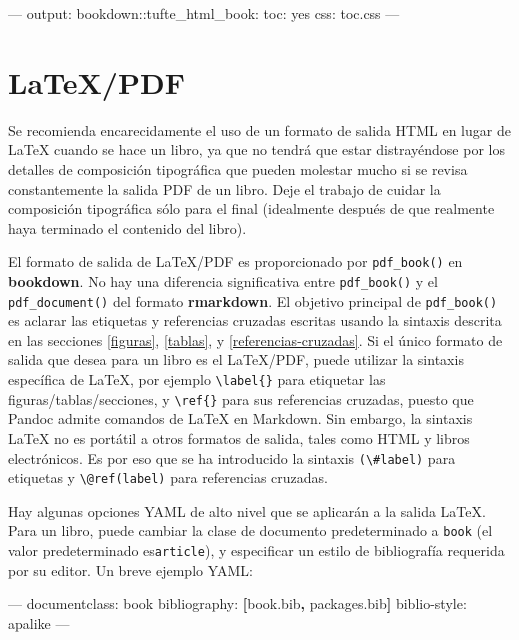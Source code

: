 \documentclass[12pt,]{krantz}
\makeatletter
\newenvironment{Shaded}{\begin{snugshade}}{\end{snugshade}}
\newcommand{\KeywordTok}[1]{\textcolor[rgb]{0.13,0.29,0.53}{\textbf{#1}}}
\newcommand{\OtherTok}[1]{\textcolor[rgb]{0.56,0.35,0.01}{#1}}
\newcommand{\FunctionTok}[1]{\textcolor[rgb]{0.00,0.00,0.00}{#1}}
\newcommand{\AttributeTok}[1]{\textcolor[rgb]{0.77,0.63,0.00}{#1}}
\newcommand{\NormalTok}[1]{#1}
\newenvironment{kframe}{%
\medskip{}
\setlength{\fboxsep}{.8em}
 \def\at@end@of@kframe{}%
 \ifinner\ifhmode%
  \def\at@end@of@kframe{\end{minipage}}%
  \begin{minipage}{\columnwidth}%
 \fi\fi%
 \def\FrameCommand##1{\hskip\@totalleftmargin \hskip-\fboxsep
 \colorbox{shadecolor}{##1}\hskip-\fboxsep
     \hskip-\linewidth \hskip-\@totalleftmargin \hskip\columnwidth}%
 \MakeFramed {\advance\hsize-\width
   \@totalleftmargin\z@ \linewidth\hsize
   \@setminipage}}%
 {\par\unskip\endMakeFramed%
 \at@end@of@kframe}
\renewenvironment{Shaded}{\begin{kframe}}{\end{kframe}}
\theoremstyle{definition}
\theoremstyle{definition}
\theoremstyle{definition}
\theoremstyle{remark}
\makeatother
\begin{document}
\begin{Shaded}
\begin{Highlighting}[]
\OtherTok{---}
\FunctionTok{output:}
  \FunctionTok{bookdown:}\AttributeTok{:tufte_html_book:}
    \FunctionTok{toc:}\AttributeTok{ yes}
    \FunctionTok{css:}\AttributeTok{ toc.css}
\OtherTok{---}
\end{Highlighting}
\end{Shaded}

\section{LaTeX/PDF}\label{latexpdf}

Se recomienda encarecidamente el uso de un formato de salida HTML en
lugar de LaTeX cuando se hace un libro, ya que no tendrá que estar
distrayéndose por los detalles de composición tipográfica que pueden
molestar mucho si se revisa constantemente la salida PDF de un libro.
Deje el trabajo de cuidar la composición tipográfica sólo para el final
(idealmente después de que realmente haya terminado el contenido del
libro).

El formato de salida de LaTeX/PDF es proporcionado por
\texttt{pdf\_book()} en \textbf{bookdown}. No hay una diferencia
significativa entre \texttt{pdf\_book()} y el \texttt{pdf\_document()}
del formato \textbf{rmarkdown}. El objetivo principal de
\texttt{pdf\_book()} es aclarar las etiquetas y referencias cruzadas
escritas usando la sintaxis descrita en las secciones \ref{figuras},
\ref{tablas}, y \ref{referencias-cruzadas}. Si el único formato de
salida que desea para un libro es el LaTeX/PDF, puede utilizar la
sintaxis específica de LaTeX, por ejemplo
\texttt{\textbackslash{}label\{\}} para etiquetar las
figuras/tablas/secciones, y \texttt{\textbackslash{}ref\{\}} para sus
referencias cruzadas, puesto que Pandoc admite comandos de LaTeX en
Markdown. Sin embargo, la sintaxis LaTeX no es portátil a otros formatos
de salida, tales como HTML y libros electrónicos. Es por eso que se ha
introducido la sintaxis \texttt{(\textbackslash{}\#label)} para
etiquetas y \texttt{\textbackslash{}@ref(label)} para referencias
cruzadas.

Hay algunas opciones YAML de alto nivel que se aplicarán a la salida
LaTeX. Para un libro, puede cambiar la clase de documento predeterminado
a \texttt{book} (el valor predeterminado es\texttt{article}), y
especificar un estilo de bibliografía requerida por su editor. Un breve
ejemplo YAML:

\begin{Shaded}
\begin{Highlighting}[]
\OtherTok{---}
\FunctionTok{documentclass:}\AttributeTok{ book}
\FunctionTok{bibliography:}\AttributeTok{ }\KeywordTok{[}\NormalTok{book.bib}\KeywordTok{,}\NormalTok{ packages.bib}\KeywordTok{]}
\FunctionTok{biblio-style:}\AttributeTok{ apalike}
\OtherTok{---}
\end{Highlighting}
\end{Shaded}
\end{document}
